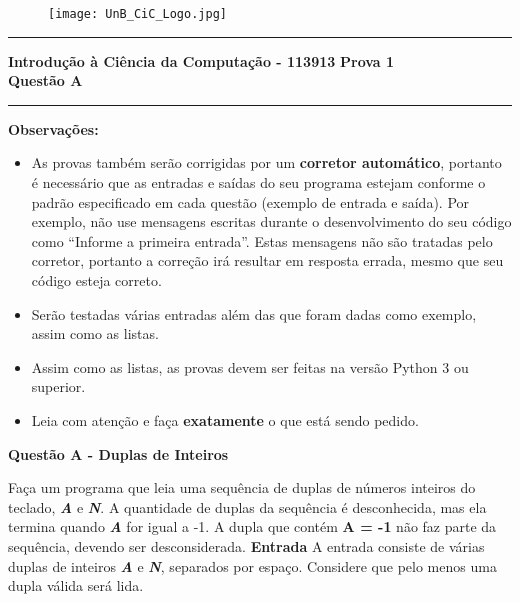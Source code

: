 \documentclass[a4paper, 12pt]{article}
\begin{document}
\begin{figure}[H]
	\texttt{[image: UnB\_CiC\_Logo.jpg]}
\end{figure}
\noindent\rule{\textwidth}{0.4pt}
\begin{center}
	\textbf{{\Large Introdução à Ciência da Computação - 113913}} \newline \newline
	\textbf{{\large Prova 1} \\
	\vspace{9pt}
	{\large Questão A}} \\
	\noindent\rule{\textwidth}{0.4pt}
	\newline
\end{center}

\textbf{{\large Observações:}}
\begin{itemize}
	\item As provas também serão corrigidas por um \textbf{corretor automático}, portanto é necessário que as entradas e saídas do seu programa estejam conforme o padrão especificado em cada questão (exemplo de entrada e saída). Por exemplo, não use mensagens escritas durante o desenvolvimento do seu código como “Informe a primeira entrada”. Estas mensagens não são tratadas pelo corretor, portanto a correção irá resultar em resposta errada, mesmo que seu código esteja correto.
	\item Serão testadas várias entradas além das que foram dadas como exemplo, assim como as listas.
	\item Assim como as listas, as provas devem ser feitas na versão Python 3 ou superior.
	\item Leia com atenção e faça \textbf{exatamente} o que está sendo pedido.
\end{itemize}
\newpage %
\begin{center}
\textbf{{\Large Questão A - Duplas de Inteiros}}
\end{center}
\vspace{5pt}
Faça um programa que leia uma sequência de duplas de números inteiros do teclado, \textbf{\textit{A}} e \textbf{\textit{N}}. A quantidade de duplas da sequência é desconhecida, mas ela termina quando \textbf{\textit{A}} for igual a -1. A dupla que contém \textbf{A = -1} não faz parte da sequência, devendo ser desconsiderada.
\newline \newline
\textbf{{\large Entrada}} \newline
A entrada consiste de várias duplas de inteiros \textbf{\textit{A}} e \textbf{\textit{N}}, separados por espaço. Considere que pelo menos uma dupla válida será lida.
\end{document}
